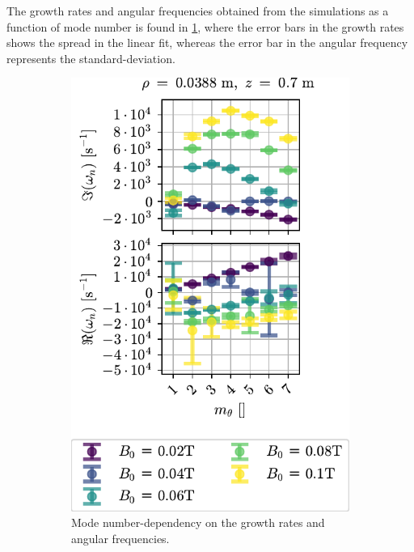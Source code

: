 The growth rates and angular frequencies obtained from the simulations as a function of mode number is found in \cref{fig:grB}, where the error bars in the growth rates shows the spread in the linear fit, whereas the error bar in the angular frequency represents the standard-deviation.
%
\begin{figure}[htbp]
    \centering
    \begin{subfigure}[h]{0.45\textwidth}
        \centering
        \includegraphics{fig/results/growthRates/growthRatesB0ModeNr}
        \caption{Mode number-dependency on the growth rates and angular frequencies.}
        \label{fig:grB}
    \end{subfigure}
    \hfill
    \begin{subfigure}[h]{0.45\textwidth}
        \centering

\end{subfigure}
\end{figure}
